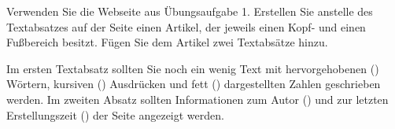 %
\par Verwenden Sie die Webseite aus Übungsaufgabe 1. Erstellen Sie anstelle des Textabsatzes auf der Seite einen Artikel, der jeweils einen Kopf- und einen Fußbereich besitzt. Fügen Sie dem Artikel zwei Textabsätze hinzu.
%
\par Im ersten Textabsatz sollten Sie noch ein wenig Text mit hervorgehobenen () Wörtern, kursiven () Ausdrücken und fett () dargestellten Zahlen geschrieben werden. Im zweiten Absatz sollten Informationen zum Autor () und zur letzten Erstellungszeit () der Seite angezeigt werden.